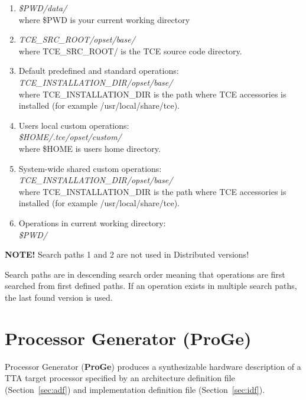\documentclass[twoside]{tceusermanual}
\begin{document}
\begin{enumerate}
\item
   \textit{\$PWD/data/} \\ where \$PWD is your current working directory

\item
   \textit{TCE\_SRC\_ROOT/opset/base/} \\ where TCE\_SRC\_ROOT/ is the
   TCE source code directory.

\item
   Default predefined and standard operations: \\
   \textit{TCE\_INSTALLATION\_DIR/opset/base/} \\ where
   TCE\_INSTALLATION\_DIR is the path where TCE accessories is installed (for
   example /usr/local/share/tce).

\item
   Users local custom operations: \\
   \textit{\$HOME/.tce/opset/custom/} \\ where \$HOME is users home directory.

\item
   System-wide shared custom operations:
   \textit{TCE\_INSTALLATION\_DIR/opset/base/} \\ where
   TCE\_INSTALLATION\_DIR is the path where TCE accessories is installed (for
   example /usr/local/share/tce).

\item
   Operations in current working directory:\\
   \textit{\$PWD/}

\end{enumerate}

\textbf{NOTE!} Search paths 1 and 2 are not used in Distributed versions!

Search paths are in descending search order meaning that operations are first
searched from first defined paths. If an operation exists in multiple search
paths, the last found version is used.


\section{Processor Generator (ProGe)}
\label{sec:proge}

Processor Generator (\textbf{ProGe}) produces a synthesizable hardware
description of a TTA target processor specified by an architecture
definition file (Section~\ref{sec:adf}) and implementation definition file
(Section~\ref{sec:idf}).
\end{document}

